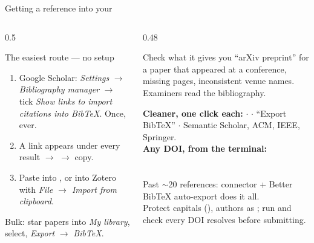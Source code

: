 \documentclass[aspectratio=169,11pt]{beamer}
\begin{document}
\begin{frame}{Getting a reference into your }
\begin{columns}[T]
\begin{column}{0.5\textwidth}
\begin{block}{The easiest route --- no setup}
\footnotesize
\begin{enumerate}
  \item Google Scholar: \emph{Settings} $\rightarrow$ \emph{Bibliography
        manager} $\rightarrow$ tick \emph{Show links to import citations into
        BibTeX}. Once, ever.
  \item A  link appears under every result $\rightarrow$
         $\rightarrow$ copy.
  \item Paste into , or into Zotero with \emph{File
        $\rightarrow$ Import from clipboard}.
\end{enumerate}
Bulk: star papers into \emph{My library}, select, \emph{Export} $\rightarrow$
\emph{BibTeX}.
\end{block}
\end{column}
\begin{column}{0.48\textwidth}
\begin{alertblock}{Check what it gives you}
\footnotesize
``arXiv preprint'' for a paper that appeared at a conference, missing pages,
inconsistent venue names. Examiners read the bibliography.
\end{alertblock}
\footnotesize
\textbf{Cleaner, one click each:}  $\cdot$ 
$\cdot$  ``Export BibTeX'' $\cdot$ Semantic Scholar, ACM, IEEE,
Springer.\\[3pt]
\textbf{Any DOI, from the terminal:}\\
\\
\\[3pt]
Past $\sim$20 references: connector + Better BibTeX auto-export does it all.\\[3pt]
Protect capitals (), authors as ; run
 and check every DOI resolves before submitting.
\end{column}
\end{columns}
\end{frame}
\end{document}
